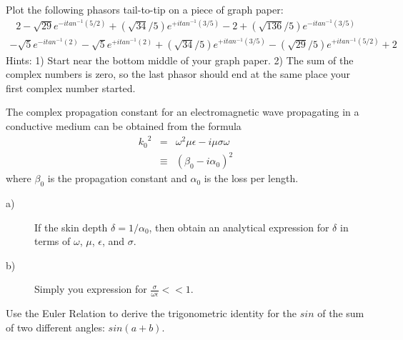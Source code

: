 \begin{problems}
Plot the following phasors tail-to-tip on a piece of graph
paper:\\
\begin{eqnarray*}
2 - \sqrt{29}e^{-i tan^{-1}(5/2)} + (\sqrt{34}/5)e^{+i tan^{-1}(3/5)} -2 + 
(\sqrt{136}/5)e^{-i tan^{-1}(3/5)}
\end{eqnarray*}
\begin{eqnarray*}
- \sqrt{5}e^{-i tan^{-1}(2)} 
- \sqrt{5}e^{+i tan^{-1}(2)} 
+ (\sqrt{34}/5)e^{+i tan^{-1}(3/5)} -
(\sqrt{29}/5)e^{+i tan^{-1}(5/2)} +2
\end{eqnarray*}
Hints: 1)  Start near the bottom middle of your graph paper.
2)  The sum of the complex numbers is zero, so the last
phasor should end at the same place your first complex number
started.
\end{problems}
\begin{problems}
The complex propagation constant for an electromagnetic
wave propagating in a conductive medium can be obtained
from the formula
\begin{eqnarray*}
        {k_0}^2 & = &  {\omega}^2 \mu \epsilon - i \mu \sigma \omega \\
        & \equiv & (\beta_0 - i\alpha_0 )^2 
\end{eqnarray*}
where ${\beta}_0$ is the propagation constant and ${\alpha}_0$
is the loss per length.  
\begin{description}
        \item[a)] If the skin depth
                $\delta = 1/ {\alpha}_0$, then
                obtain an analytical expression for $\delta$ in terms of
                $\omega$, $\mu$, $\epsilon$, and $\sigma$.
        \item[b)] Simply you expression for 
                $\frac{\sigma}{\omega \epsilon} << 1$.
\end{description}
\end{problems}

\begin{problems}
Use the Euler Relation to derive the trigonometric identity for
the $sin$ of the sum of two different angles:  $sin(a+b)$.
\end{problems}

